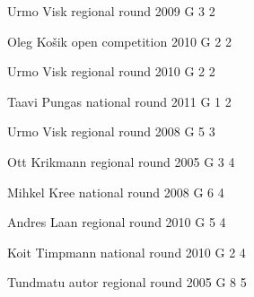 \documentclass[11pt]{article}
\begin{document}
\ylDisplay{} %
{Urmo Visk} %
{regional round} %
{2009} %
{G 3} %
{2} %
{

\ifEngStatement
\fi
}

\ylDisplay{} %
{Oleg Košik} %
{open competition} %
{2010} %
{G 2} %
{2} %
{

\ifEngStatement
\fi
}

\ylDisplay{} %
{Urmo Visk} %
{regional round} %
{2010} %
{G 2} %
{2} %
{

\ifEngStatement
\fi
}

\ylDisplay{} %
{Taavi Pungas} %
{national round} %
{2011} %
{G 1} %
{2} %
{

\ifEngStatement
\fi
}

\ylDisplay{} %
{Urmo Visk} %
{regional round} %
{2008} %
{G 5} %
{3} %
{

\ifEngStatement
\fi
}

\ylDisplay{} %
{Ott Krikmann} %
{regional round} %
{2005} %
{G 3} %
{4} %
{

\ifEngStatement
\fi
}

\ylDisplay{} %
{Mihkel Kree} %
{national round} %
{2008} %
{G 6} %
{4} %
{

\ifEngStatement
\fi
}

\ylDisplay{} %
{Andres Laan} %
{regional round} %
{2010} %
{G 5} %
{4} %
{

\ifEngStatement
\fi
}

\ylDisplay{} %
{Koit Timpmann} %
{national round} %
{2010} %
{G 2} %
{4} %
{

\ifEngStatement
\fi
}

\ylDisplay{} %
{Tundmatu autor} %
{regional round} %
{2005} %
{G 8} %
{5} %
{

\ifEngStatement
\fi
}
\end{document}
